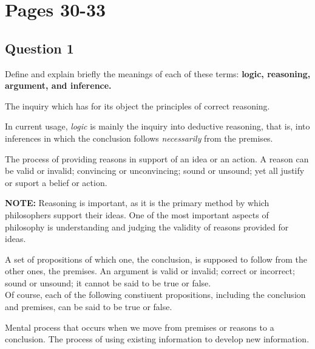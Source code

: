
\section{Pages 30-33}

\subsection{Question 1}
Define and explain briefly the meanings of each of these terms: 
\textbf{logic, reasoning, argument, and inference.}

\begin{definition}[Logic]
    The inquiry which has for its object the principles of correct reasoning.

    In current usage, \textit{logic} is mainly the inquiry into deductive reasoning,
    that is, into inferences in which the conclusion follows \textit{necessarily} from the premises.
\end{definition}

\begin{definition}[Reasoning]
    The process of providing reasons in support of an idea or an action.
    A reason can be valid or invalid; convincing or unconvincing; sound or unsound; 
    yet all justify or suport a belief or action.
\end{definition}
\textbf{NOTE:} Reasoning is important, as it is the primary method by which
philosophers support their ideas. One of the most important aspects of philosophy 
is understanding and judging the validity of reasons provided for ideas. \\

\begin{definition}[Argument]
    A set of propositions of which one, the conclusion, is supposed to follow 
    from the other ones, the premises. An argument is valid or invalid; correct
    or incorrect; sound or unsound; it cannot be said to be true or false. \\

    Of course, each of the following constiuent propositions, including the 
    conclusion and premises, can be said to be true or false.
\end{definition}

\begin{definition}[Inference]
    Mental process that occurs when we move from premises or reasons to 
    a conclusion. The process of using existing information to develop new information.
\end{definition} \\

